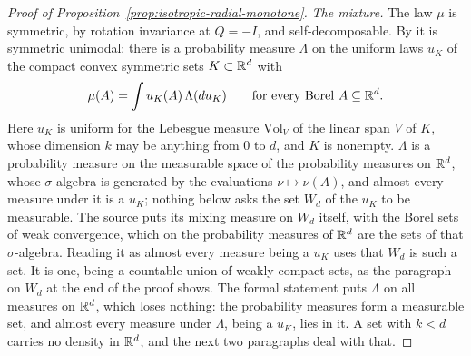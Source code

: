 \begin{proof}[Proof of Proposition~\ref{prop:isotropic-radial-monotone}]
\emph{The mixture.} The law $\mu$ is symmetric, by rotation invariance at $Q = -I$, and
self-decomposable. By  it is symmetric unimodal: there is a probability measure
$\Lambda$ on the uniform laws $u_K$ of the compact convex symmetric sets $K \subset \mathbb{R}^d$ with
\[
  \mu(A) = \int u_K(A)\,\Lambda(du_K) \qquad \text{for every Borel } A \subseteq \mathbb{R}^d .
\]
Here $u_K$ is uniform for the Lebesgue measure $\mathrm{Vol}_V$ of the linear span $V$ of $K$, whose
dimension $k$ may be anything from $0$ to $d$, and $K$ is nonempty. $\Lambda$ is a probability
measure on the measurable space of the probability measures on $\mathbb{R}^d$, whose $\sigma$-algebra is
generated by the evaluations $\nu \mapsto \nu(A)$, and almost every measure under it is a $u_K$;
nothing below asks the set $W_d$ of the $u_K$ to be measurable. The source puts its mixing measure
on $W_d$ itself, with the Borel sets of weak convergence, which on the probability measures of
$\mathbb{R}^d$ are the sets of that $\sigma$-algebra. Reading it as almost every measure being a $u_K$
uses that $W_d$ is such a set. It is one, being a countable union of weakly compact sets, as the
paragraph on $W_d$ at the end of the proof shows. The formal statement puts
$\Lambda$ on all measures on $\mathbb{R}^d$, which loses nothing: the probability measures form a
measurable set, and almost every measure under $\Lambda$, being a $u_K$, lies in it. A set with
$k < d$ carries no density in $\mathbb{R}^d$, and the next two paragraphs deal with that.


\end{proof}
